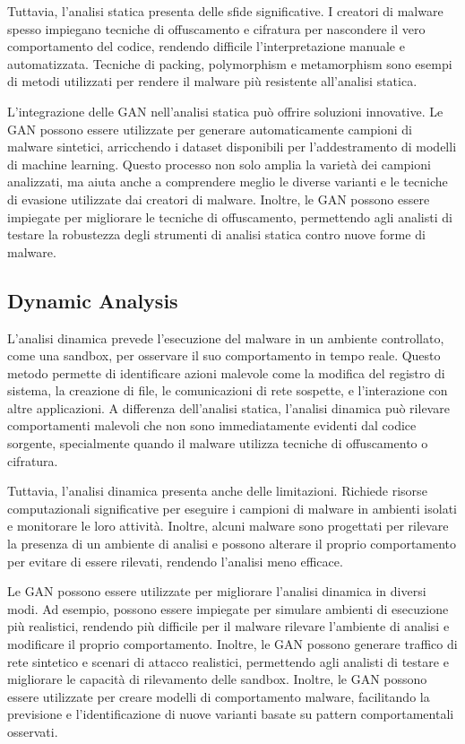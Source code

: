 Tuttavia, l'analisi statica presenta delle sfide significative. I creatori di malware spesso impiegano tecniche di offuscamento e cifratura per nascondere il vero comportamento del codice, rendendo difficile l'interpretazione manuale e automatizzata. Tecniche di packing, polymorphism e metamorphism sono esempi di metodi utilizzati per rendere il malware più resistente all'analisi statica.

L'integrazione delle GAN nell'analisi statica può offrire soluzioni innovative. Le GAN possono essere utilizzate per generare automaticamente campioni di malware sintetici, arricchendo i dataset disponibili per l'addestramento di modelli di machine learning. Questo processo non solo amplia la varietà dei campioni analizzati, ma aiuta anche a comprendere meglio le diverse varianti e le tecniche di evasione utilizzate dai creatori di malware. Inoltre, le GAN possono essere impiegate per migliorare le tecniche di offuscamento, permettendo agli analisti di testare la robustezza degli strumenti di analisi statica contro nuove forme di malware.

\subsection{Dynamic Analysis}

L'analisi dinamica prevede l'esecuzione del malware in un ambiente controllato, come una sandbox, per osservare il suo comportamento in tempo reale. Questo metodo permette di identificare azioni malevole come la modifica del registro di sistema, la creazione di file, le comunicazioni di rete sospette, e l'interazione con altre applicazioni. A differenza dell'analisi statica, l'analisi dinamica può rilevare comportamenti malevoli che non sono immediatamente evidenti dal codice sorgente, specialmente quando il malware utilizza tecniche di offuscamento o cifratura.

Tuttavia, l'analisi dinamica presenta anche delle limitazioni. Richiede risorse computazionali significative per eseguire i campioni di malware in ambienti isolati e monitorare le loro attività. Inoltre, alcuni malware sono progettati per rilevare la presenza di un ambiente di analisi e possono alterare il proprio comportamento per evitare di essere rilevati, rendendo l'analisi meno efficace.

Le GAN possono essere utilizzate per migliorare l'analisi dinamica in diversi modi. Ad esempio, possono essere impiegate per simulare ambienti di esecuzione più realistici, rendendo più difficile per il malware rilevare l'ambiente di analisi e modificare il proprio comportamento. Inoltre, le GAN possono generare traffico di rete sintetico e scenari di attacco realistici, permettendo agli analisti di testare e migliorare le capacità di rilevamento delle sandbox. Inoltre, le GAN possono essere utilizzate per creare modelli di comportamento malware, facilitando la previsione e l'identificazione di nuove varianti basate su pattern comportamentali osservati.

